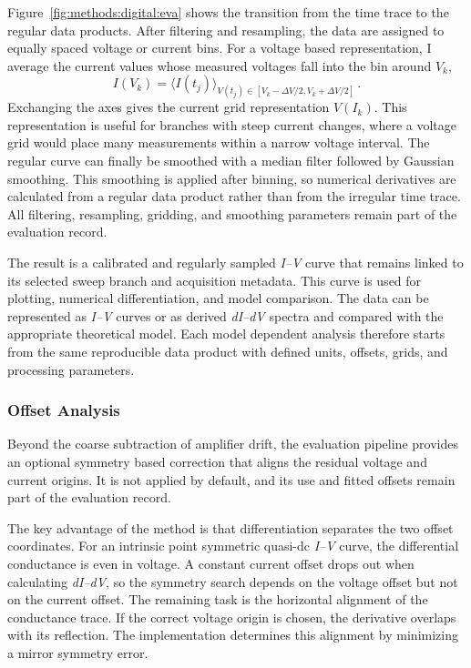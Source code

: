            Figure~\ref{fig:methods:digital:eva} shows the transition from the time trace to the regular data products. After filtering and resampling, the data are assigned to equally spaced voltage or current bins. For a voltage based representation, I average the current values whose measured voltages fall into the bin around $V_k$,
            \begin{equation}
                I(V_k) = \langle I(t_j) \rangle_{V(t_j) \in [V_k-\Delta V/2, V_k+\Delta V/2]}\,.
                \label{eq:methods:digital:voltage-binning}
            \end{equation}
            Exchanging the axes gives the current grid representation $V(I_k)$. This representation is useful for branches with steep current changes, where a voltage grid would place many measurements within a narrow voltage interval. The regular curve can finally be smoothed with a median filter followed by Gaussian smoothing. This smoothing is applied after binning, so numerical derivatives are calculated from a regular data product rather than from the irregular time trace. All filtering, resampling, gridding, and smoothing parameters remain part of the evaluation record.

            The result is a calibrated and regularly sampled \textit{I--V} curve that remains linked to its selected sweep branch and acquisition metadata. This curve is used for plotting, numerical differentiation, and model comparison. The data can be represented as \textit{I--V} curves or as derived \textit{dI--dV} spectra and compared with the appropriate theoretical model. Each model dependent analysis therefore starts from the same reproducible data product with defined units, offsets, grids, and processing parameters.

        \subsubsection*{Offset Analysis}

            Beyond the coarse subtraction of amplifier drift, the evaluation pipeline provides an optional symmetry based correction that aligns the residual voltage and current origins. It is not applied by default, and its use and fitted offsets remain part of the evaluation record.

            The key advantage of the method is that differentiation separates the two offset coordinates. For an intrinsic point symmetric quasi-dc \textit{I--V} curve, the differential conductance is even in voltage. A constant current offset drops out when calculating \textit{dI--dV}, so the symmetry search depends on the voltage offset but not on the current offset. The remaining task is the horizontal alignment of the conductance trace. If the correct voltage origin is chosen, the derivative overlaps with its reflection. The implementation determines this alignment by minimizing a mirror symmetry error.

